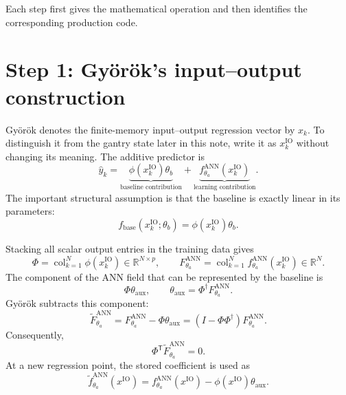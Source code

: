 \documentclass[11pt,a4paper]{article}
\newcommand{\R}{\mathbb{R}}
\newcommand{\col}{\operatorname{col}}
\newcommand{\T}{\mathsf{T}}
\begin{document}
Each step first gives the mathematical operation and then identifies the
corresponding production code.

\section{Step 1: Gy\"or\"ok's input--output construction}

Gy\"or\"ok denotes the finite-memory input--output regression vector by
\(x_k\).  To distinguish it from the gantry state later in this note, write it
as \(x_k^{\mathrm{IO}}\) without changing its meaning.  The additive predictor
is
\begin{equation}
\boxed{
\widehat y_k
=
\underbrace{\phi(x_k^{\mathrm{IO}})\theta_b}_{\text{baseline contribution}}
+
\underbrace{f_{\theta_a}^{\mathrm{ANN}}(x_k^{\mathrm{IO}})}_{\text{learning contribution}}.
}
\label{eq:gyorok-model}
\end{equation}
The important structural assumption is that the baseline is exactly linear in
its parameters:
\begin{equation}
f_{\mathrm{base}}(x_k^{\mathrm{IO}};\theta_b)
=\phi(x_k^{\mathrm{IO}})\theta_b.
\label{eq:gyorok-linear}
\end{equation}

Stacking all scalar output entries in the training data gives
\begin{equation}
\Phi=\col_{k=1}^{N}\phi(x_k^{\mathrm{IO}})\in\R^{N\times p},
\qquad
F_{\theta_a}^{\mathrm{ANN}}
=\col_{k=1}^{N}f_{\theta_a}^{\mathrm{ANN}}(x_k^{\mathrm{IO}})\in\R^N.
\end{equation}
The component of the ANN field that can be represented by the baseline is
\begin{equation}
\Phi\theta_{\mathrm{aux}},
\qquad
\theta_{\mathrm{aux}}=\Phi^\dagger F_{\theta_a}^{\mathrm{ANN}}.
\end{equation}
Gy\"or\"ok subtracts this component:
\begin{equation}
\boxed{
\widetilde F_{\theta_a}^{\mathrm{ANN}}
=F_{\theta_a}^{\mathrm{ANN}}-\Phi\theta_{\mathrm{aux}}
=(I-\Phi\Phi^\dagger)F_{\theta_a}^{\mathrm{ANN}}.
}
\label{eq:gyorok-projection}
\end{equation}
Consequently,
\begin{equation}
\boxed{\Phi^\T\widetilde F_{\theta_a}^{\mathrm{ANN}}=0.}
\label{eq:gyorok-orthogonality}
\end{equation}
At a new regression point, the stored coefficient is used as
\begin{equation}
\widetilde f_{\theta_a}^{\mathrm{ANN}}(x^{\mathrm{IO}})
=f_{\theta_a}^{\mathrm{ANN}}(x^{\mathrm{IO}})
-\phi(x^{\mathrm{IO}})\theta_{\mathrm{aux}}.
\label{eq:gyorok-prediction}
\end{equation}
\end{document}
